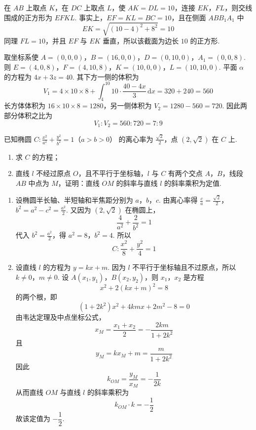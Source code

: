 \begin{solution}
在 \(AB\) 上取点 \(K\)，在 \(DC\) 上取点 \(L\)，使 \(AK=DL=10\)，连接 \(EK\)，\(FL\)，则交线围成的正方形为 \(EFKL\). 事实上，\(EF=KL=BC=10\)，且在侧面 \(ABB_{1}A_{1}\) 中
\[
EK=\sqrt{(10-4)^{2}+8^{2}}=10
\]
同理 \(FL=10\)，并且 \(EF\) 与 \(EK\) 垂直，所以该截面为边长 \(10\) 的正方形.

取坐标系使 \(A=(0,0,0)\)，\(B=(16,0,0)\)，\(D=(0,10,0)\)，\(A_{1}=(0,0,8)\). 则
\(E=(4,0,8)\)，\(F=(4,10,8)\)，\(K=(10,0,0)\)，\(L=(10,10,0)\).
平面 \(\alpha\) 的方程为 \(4x+3z=40\). 其下方一侧的体积为
\[
V_{1}=4\times10\times8+\int_{4}^{10}10\cdot\frac{40-4x}{3}\,\mathrm{d}x=320+240=560
\]
长方体体积为 \(16\times10\times8=1280\)，另一侧体积为 \(V_{2}=1280-560=720\). 因此两部分体积之比为
\[
V_{1}:V_{2}=560:720=7:9
\]
\end{solution}

\begin{problem}
已知椭圆 \(C: \frac{x^2}{a^2} + \frac{y^2}{b^2} = 1\)（\(a > b > 0\)） 的离心率为 \(\frac{\sqrt{2}}{2}\)，点 \((2, \sqrt{2})\) 在 \(C\) 上.
\begin{enumerate}
\item 求 \(C\) 的方程；
\item 直线 \(l\) 不经过原点 \(O\)，且不平行于坐标轴，\(l\) 与 \(C\) 有两个交点 \(A\)，\(B\)，线段 \(AB\) 中点为 \(M\)，证明：直线 \(OM\) 的斜率与直线 \(l\) 的斜率乘积为定值.
\end{enumerate}
\end{problem}

\begin{solution}
\begin{enumerate}
\item 设椭圆半长轴、半短轴和半焦距分别为 \(a\)，\(b\)，\(c\). 由离心率得
\(\frac{c}{a}=\frac{\sqrt2}{2}\)，\(b^{2}=a^{2}-c^{2}=\frac{a^{2}}{2}\).
又因为 \((2,\sqrt2)\) 在椭圆上，
\[
\frac{4}{a^{2}}+\frac{2}{b^{2}}=1
\]
代入 \(b^{2}=\frac{a^{2}}{2}\)，得 \(a^{2}=8\)，\(b^{2}=4\). 所以
\[
C:\frac{x^{2}}{8}+\frac{y^{2}}{4}=1
\]

\item 设直线 \(l\) 的方程为 \(y=kx+m\). 因为 \(l\) 不平行于坐标轴且不过原点，所以 \(k\ne0\)，\(m\ne0\). 设 \(A(x_{1},y_{1})\)，\(B(x_{2},y_{2})\)，则 \(x_{1}\)，\(x_{2}\) 是方程
\[
x^{2}+2(kx+m)^{2}=8
\]
的两个根，即
\[
(1+2k^{2})x^{2}+4kmx+2m^{2}-8=0
\]
由韦达定理及中点坐标公式，
\[
x_{M}=\frac{x_{1}+x_{2}}{2}=-\frac{2km}{1+2k^{2}}
\]
且
\[
y_{M}=kx_{M}+m=\frac{m}{1+2k^{2}}
\]
因此
\[
k_{OM}=\frac{y_{M}}{x_{M}}=-\frac{1}{2k}
\]
从而直线 \(OM\) 与直线 \(l\) 的斜率乘积为
\[
k_{OM}\cdot k=-\frac12
\]
故该定值为 \(-\dfrac12\).
\end{enumerate}
\end{solution}

